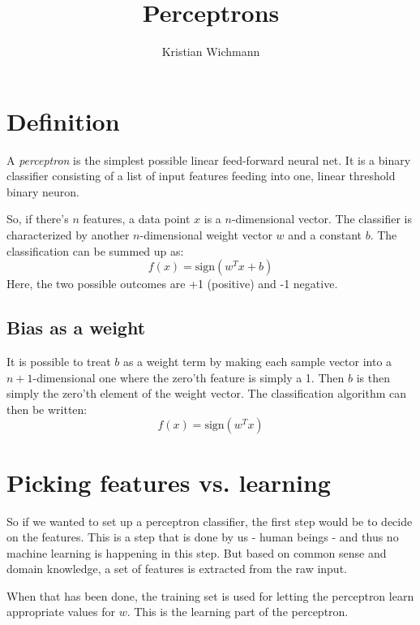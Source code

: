 \documentclass[12pt, a4paper]{article}
\title{Perceptrons}
\author{Kristian Wichmann}
\numberwithin{equation}{section}
\begin{document}
\maketitle

\section{Definition}
A \textit{perceptron} is the simplest possible linear feed-forward neural net. It is a binary classifier consisting of a list of input features feeding into one, linear threshold binary neuron.

So, if there's $n$ features, a data point $x$ is a $n$-dimensional vector. The classifier is characterized by another $n$-dimensional weight vector $w$ and a constant $b$. The classification can be summed up as:
\begin{equation}
f(x)=\textrm{sign}(w^T x+b)
\end{equation}
Here, the two possible outcomes are +1 (positive) and -1 negative.

\subsection{Bias as a weight}
It is possible to treat $b$ as a weight term by making each sample vector into a $n+1$-dimensional one where the zero'th feature is simply a 1. Then $b$ is then simply the zero'th element of the weight vector. The classification algorithm can then be written:
\begin{equation}
f(x)=\textrm{sign}(w^T x)
\end{equation}

\section{Picking features vs. learning}
So if we wanted to set up a perceptron classifier, the first step would be to decide on the features. This is a step that is done by us - human beings - and thus no machine learning is happening in this step. But based on common sense and domain knowledge, a set of features is extracted from the raw input.

When that has been done, the training set is used for letting the perceptron learn appropriate values for $w$. This is the learning part of the perceptron.
\end{document}
